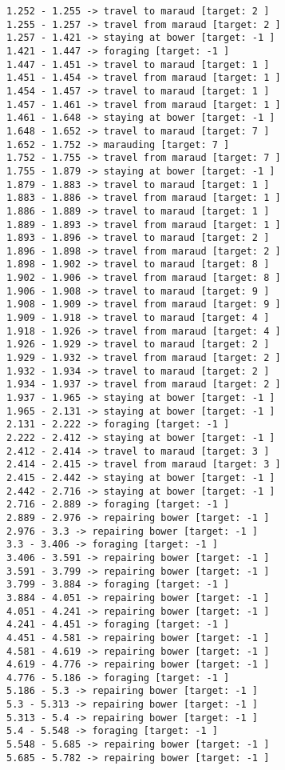 \documentclass[11pt]{article}
\begin{document}
\begin{Verbatim}[commandchars=\\\{\}]
1.252 - 1.255 -> travel to maraud [target: 2 ]
1.255 - 1.257 -> travel from maraud [target: 2 ]
1.257 - 1.421 -> staying at bower [target: -1 ]
1.421 - 1.447 -> foraging [target: -1 ]
1.447 - 1.451 -> travel to maraud [target: 1 ]
1.451 - 1.454 -> travel from maraud [target: 1 ]
1.454 - 1.457 -> travel to maraud [target: 1 ]
1.457 - 1.461 -> travel from maraud [target: 1 ]
1.461 - 1.648 -> staying at bower [target: -1 ]
1.648 - 1.652 -> travel to maraud [target: 7 ]
1.652 - 1.752 -> marauding [target: 7 ]
1.752 - 1.755 -> travel from maraud [target: 7 ]
1.755 - 1.879 -> staying at bower [target: -1 ]
1.879 - 1.883 -> travel to maraud [target: 1 ]
1.883 - 1.886 -> travel from maraud [target: 1 ]
1.886 - 1.889 -> travel to maraud [target: 1 ]
1.889 - 1.893 -> travel from maraud [target: 1 ]
1.893 - 1.896 -> travel to maraud [target: 2 ]
1.896 - 1.898 -> travel from maraud [target: 2 ]
1.898 - 1.902 -> travel to maraud [target: 8 ]
1.902 - 1.906 -> travel from maraud [target: 8 ]
1.906 - 1.908 -> travel to maraud [target: 9 ]
1.908 - 1.909 -> travel from maraud [target: 9 ]
1.909 - 1.918 -> travel to maraud [target: 4 ]
1.918 - 1.926 -> travel from maraud [target: 4 ]
1.926 - 1.929 -> travel to maraud [target: 2 ]
1.929 - 1.932 -> travel from maraud [target: 2 ]
1.932 - 1.934 -> travel to maraud [target: 2 ]
1.934 - 1.937 -> travel from maraud [target: 2 ]
1.937 - 1.965 -> staying at bower [target: -1 ]
1.965 - 2.131 -> staying at bower [target: -1 ]
2.131 - 2.222 -> foraging [target: -1 ]
2.222 - 2.412 -> staying at bower [target: -1 ]
2.412 - 2.414 -> travel to maraud [target: 3 ]
2.414 - 2.415 -> travel from maraud [target: 3 ]
2.415 - 2.442 -> staying at bower [target: -1 ]
2.442 - 2.716 -> staying at bower [target: -1 ]
2.716 - 2.889 -> foraging [target: -1 ]
2.889 - 2.976 -> repairing bower [target: -1 ]
2.976 - 3.3 -> repairing bower [target: -1 ]
3.3 - 3.406 -> foraging [target: -1 ]
3.406 - 3.591 -> repairing bower [target: -1 ]
3.591 - 3.799 -> repairing bower [target: -1 ]
3.799 - 3.884 -> foraging [target: -1 ]
3.884 - 4.051 -> repairing bower [target: -1 ]
4.051 - 4.241 -> repairing bower [target: -1 ]
4.241 - 4.451 -> foraging [target: -1 ]
4.451 - 4.581 -> repairing bower [target: -1 ]
4.581 - 4.619 -> repairing bower [target: -1 ]
4.619 - 4.776 -> repairing bower [target: -1 ]
4.776 - 5.186 -> foraging [target: -1 ]
5.186 - 5.3 -> repairing bower [target: -1 ]
5.3 - 5.313 -> repairing bower [target: -1 ]
5.313 - 5.4 -> repairing bower [target: -1 ]
5.4 - 5.548 -> foraging [target: -1 ]
5.548 - 5.685 -> repairing bower [target: -1 ]
5.685 - 5.782 -> repairing bower [target: -1 ]

\end{Verbatim}
\end{document}
